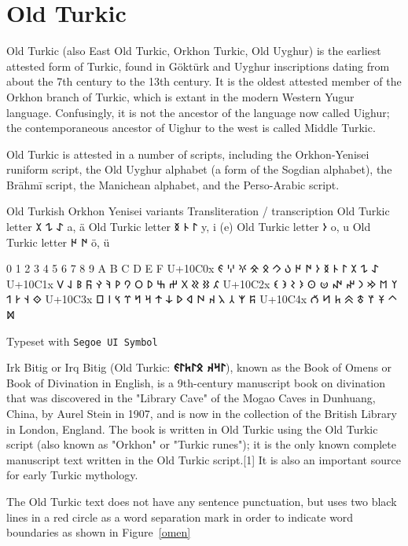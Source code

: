 \section{Old Turkic}
\label{s:oldturkic}

Old Turkic (also East Old Turkic, Orkhon Turkic, Old Uyghur) is the earliest attested form of Turkic, found in Göktürk and Uyghur inscriptions dating from about the 7th century to the 13th century. It is the oldest attested member of the Orkhon branch of Turkic, which is extant in the modern Western Yugur language. Confusingly, it is not the ancestor of the language now called Uighur; the contemporaneous ancestor of Uighur to the west is called Middle Turkic.

Old Turkic is attested in a number of scripts, including the Orkhon-Yenisei runiform script, the Old Uyghur alphabet (a form of the Sogdian alphabet), the Brāhmī script, the Manichean alphabet, and the Perso-Arabic script.

\newfontfamily{}
\begin{scriptexample}[]{Old Turkish}
\oldturkic
\obeylines
Orkhon	Yenisei
variants	Transliteration / transcription
Old Turkic letter  𐰀	𐰁 𐰂	a, ä
Old Turkic letter  𐰃	𐰄 𐰅	y, i (e)
Old Turkic letter  𐰆		o, u
Old Turkic letter  𐰇	𐰈	ö, ü

	0	1	2	3	4	5	6	7	8	9	A	B	C	D	E	F
U+10C0x	𐰀	𐰁	𐰂	𐰃	𐰄	𐰅	𐰆	𐰇	𐰈	𐰉	𐰊	𐰋	𐰌	𐰍	𐰎	𐰏
U+10C1x	𐰐	𐰑	𐰒	𐰓	𐰔	𐰕	𐰖	𐰗	𐰘	𐰙	𐰚	𐰛	𐰜	𐰝	𐰞	𐰟
U+10C2x	𐰠	𐰡	𐰢	𐰣	𐰤	𐰥	𐰦	𐰧	𐰨	𐰩	𐰪	𐰫	𐰬	𐰭	𐰮	𐰯
U+10C3x	𐰰	𐰱	𐰲	𐰳	𐰴	𐰵	𐰶	𐰷	𐰸	𐰹	𐰺	𐰻	𐰼	𐰽	𐰾	𐰿
U+10C4x	𐱀	𐱁	𐱂	𐱃	𐱄	𐱅	𐱆	𐱇	𐱈	

\hfill  Typeset with \texttt{Segoe UI Symbol} \cmd{\oldturkic} 
\end{scriptexample}

Irk Bitig or Irq Bitig (Old Turkic: {\bfseries\Large\oldturkic 𐰃𐰺𐰴 𐰋𐰃𐱅𐰃𐰏}), known as the Book of Omens or Book of Divination in English, is a 9th-century manuscript book on divination that was discovered in the "Library Cave" of the Mogao Caves in Dunhuang, China, by Aurel Stein in 1907, and is now in the collection of the British Library in London, England. The book is written in Old Turkic using the Old Turkic script (also known as "Orkhon" or "Turkic runes"); it is the only known complete manuscript text written in the Old Turkic script.[1] It is also an important source for early Turkic mythology.

The Old Turkic text does not have any sentence punctuation, but uses two black lines in a red circle as a word separation mark in order to indicate word boundaries as shown in Figure~{\ref{omen}}

